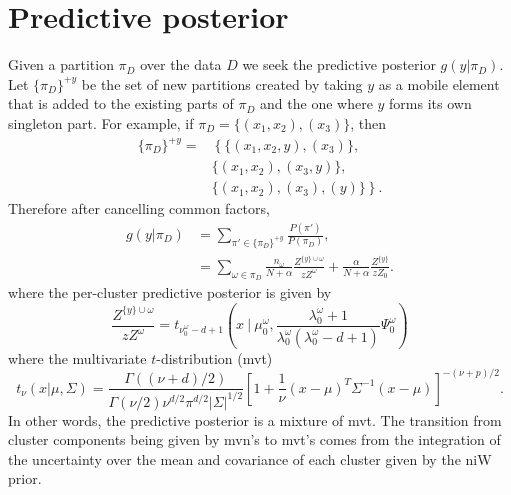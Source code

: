 \documentclass[11pt, oneside]{article}   	%
\begin{document}
\section{Predictive posterior}
Given a partition $\pi_D$ over the data $D$ we seek the predictive posterior $g(y\vert\pi_D)$. Let $\lbrace\pi_D\rbrace^{+y}$ be the set of new partitions created by taking $y$ as a mobile element that is added to the existing parts of $\pi_D$ and the one where $y$ forms its own singleton part. For example, if $\pi_D = \lbrace (x_1, x_2),(x_3)\rbrace$, then
\begin{equation}\begin{split}
\lbrace \pi_D\rbrace^{+y} =&\left\lbrace\lbrace (x_1, x_2, y),( x_3)\rbrace,\right.\\
&\left.\lbrace( x_1, x_2),( x_3, y)\rbrace,\right.\\
&\left.\lbrace (x_1, x_2),( x_3), ( y)\rbrace\right\rbrace.
\end{split}\end{equation}
Therefore after cancelling common factors,
\begin{equation}\begin{split}\label{eq:predpost}
g(y \vert\pi_D) &= \sum_{\pi'\in\lbrace\pi_D\rbrace^{+y}}\frac{P(\pi')}{P(\pi_D)},\\
&= \sum_{\omega\in\pi_D} \frac{n_\omega}{N + \alpha}\frac{Z^{\lbrace y\rbrace\cup\omega}}{z Z^\omega} + \frac{\alpha}{N + \alpha} \frac{Z^{\lbrace y\rbrace}}{z Z_0}.
\end{split}\end{equation}
where the per-cluster predictive posterior is given by
$$\frac{Z^{\lbrace y\rbrace\cup\omega}}{z Z^\omega} = t_{\nu^{\omega}_0 - d + 1}\left(x~\vert~\mu_0^{\omega}, \frac{\lambda_0^\omega + 1}{\lambda_0^\omega(\lambda_0^\omega - d + 1)} \Psi_0^\omega\right)$$
where the multivariate $t$-distribution (mvt)
$$ t_\nu(x\vert\mu,\Sigma) = \frac{\Gamma((\nu + d)/2)}{\Gamma(\nu/2)\nu^{d/2}\pi^{d/2}\vert\Sigma\vert^{1/2}}\left[1 + \frac{1}{\nu}(x - \mu)^T\Sigma^{-1}(x - \mu)\right]^{-(\nu + p)/2}.$$
In other words, the predictive posterior is a mixture of mvt. The transition from cluster components being given by mvn's to mvt's comes from the integration of the uncertainty over the mean and covariance of each cluster given by the niW prior.
\end{document}
